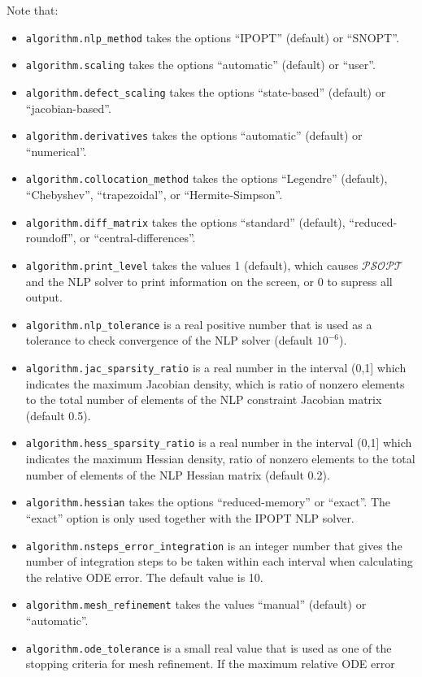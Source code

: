 \documentclass[a4paper,11pt]{report}    %
\newcommand{\psopt}{$\mathcal{PSOPT}$\,}  %
\begin{document}
Note that:
\begin{itemize}
 \item \verb|algorithm.nlp_method| takes the options ``IPOPT'' (default)
 or ``SNOPT''.
\item \verb|algorithm.scaling| takes the options ``automatic'' (default)
or ``user''.
\item \verb|algorithm.defect_scaling|  takes the options ``state-based'' (default)
or ``jacobian-based''.
\item \verb|algorithm.derivatives|  takes the options ``automatic'' (default)
or ``numerical''.
\item \verb|algorithm.collocation_method|  takes the options ``Legendre'' (default), ``Chebyshev'',
``trapezoidal'', or ``Hermite-Simpson''.
\item \verb|algorithm.diff_matrix| takes the options ``standard'' (default), ``reduced-roundoff'', or ``central-differences''.
\item \verb|algorithm.print_level| takes the values  1 (default), which causes \psopt and the NLP solver
to print information on the screen, or 0 to supress all output.
\item \verb|algorithm.nlp_tolerance| is a real positive number that is used as a tolerance to check convergence of the NLP solver (default $10^{-6}$).
\item \verb|algorithm.jac_sparsity_ratio| is a real number in the interval (0,1] which indicates the maximum Jacobian density, which is ratio of nonzero elements
to the total number of elements of the NLP constraint Jacobian matrix (default 0.5).
\item \verb|algorithm.hess_sparsity_ratio| is a real number in the interval (0,1] which indicates the maximum Hessian density, ratio of nonzero elements
to the total number of elements of the NLP Hessian matrix (default 0.2).
\item \verb|algorithm.hessian| takes the options ``reduced-memory'' or ``exact''. The ``exact'' option is only used together with the IPOPT NLP solver.
\item \verb|algorithm.nsteps_error_integration| is an integer number that gives the number of integration steps to be taken within each interval when calculating
the relative ODE error. The default value is 10.
\item \verb|algorithm.mesh_refinement| takes the values ``manual'' (default) or ``automatic''.
\item \verb|algorithm.ode_tolerance| is a small real value that is used as one of the stopping criteria for mesh refinement. If the maximum relative ODE error

\end{itemize}
\end{document}
